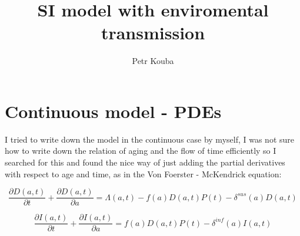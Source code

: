 \documentclass[10pt]{article}         %
\title{SI model with enviromental transmission}
\author{Petr Kouba}
\begin{document}
\maketitle

\section{Continuous model - PDEs}
\label{continuous}
I tried to write down the model in the continuous case by myself, I was not sure how to write down the relation of aging and the flow of time efficiently so I searched for this and found the nice way of just adding the partial derivatives with respect to age and time, as in the Von Foerster - McKendrick equation\cite{McKendrick}:

\begin{equation}
	\frac{\partial D(a,t)}{\partial t} + \frac{\partial D(a,t)}{\partial a}= \Lambda(a,t) - f(a)D(a,t)P(t) - \delta^{sus}(a)D(a,t)
\end{equation}

\begin{equation}
	\frac{\partial I(a,t)}{\partial t} + \frac{\partial I(a,t)}{\partial a}= f(a)D(a,t)P(t) - \delta^{inf}(a)I(a,t)
\end{equation}
\end{document}

